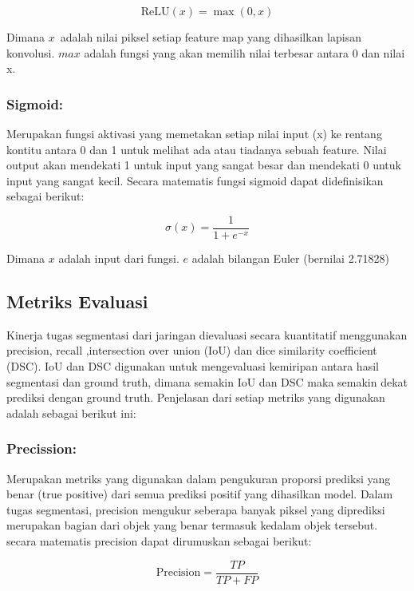 \begin{equation}
	\text{ReLU}(x) = \max(0, x)
\end{equation}

Dimana \(x\)\ adalah nilai piksel setiap feature map yang dihasilkan lapisan konvolusi. \(max\) adalah fungsi yang akan memilih nilai terbesar antara 0 dan nilai x.

\subsubsection{Sigmoid:}
Merupakan fungsi aktivasi yang memetakan setiap nilai input (x) ke rentang kontitu antara 0 dan 1 untuk melihat ada atau tiadanya sebuah feature. Nilai output akan mendekati 1 untuk input yang sangat besar dan mendekati 0 untuk input yang sangat kecil. Secara matematis fungsi sigmoid dapat didefinisikan sebagai berikut:

\begin{equation}
	\sigma(x) = \frac{1}{1 + e^{-x}}
\end{equation}

Dimana \(x\) adalah input dari fungsi. \(e\) adalah bilangan Euler (bernilai 2.71828)


\subsection{Metriks Evaluasi}
\noindent Kinerja tugas segmentasi dari jaringan dievaluasi secara kuantitatif menggunakan precision, recall ,intersection over union (IoU) dan dice similarity coefficient (DSC). IoU dan DSC digunakan untuk mengevaluasi kemiripan antara hasil segmentasi dan ground truth, dimana semakin IoU dan DSC maka semakin dekat prediksi dengan ground truth. Penjelasan dari setiap metriks yang digunakan adalah sebagai berikut ini:

\subsubsection{Precission:}
\noindent Merupakan metriks yang digunakan dalam pengukuran proporsi prediksi yang benar (true positive) dari semua prediksi positif yang dihasilkan model. Dalam tugas segmentasi, precision mengukur seberapa banyak piksel yang diprediksi merupakan bagian dari objek yang benar termasuk kedalam objek tersebut. secara matematis precision dapat dirumuskan sebagai berikut:

\begin{equation}
	\text{Precision} = \frac{TP}{TP + FP}
\end{equation}

